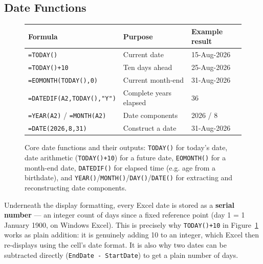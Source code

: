 \documentclass[11pt,a4paper]{article}
\begin{document}
\subsection{Date Functions}
\label{sec:datefunctions}

\begin{figure}[h]
\centering
\begin{tcolorbox}[width=0.86\linewidth,colback=white,colframe=rulegray,boxrule=0.5pt,arc=1pt]
\centering\small
\begin{tabular}{@{}L{4.8cm}L{2.8cm}L{2.6cm}@{}}
\toprule
\textbf{Formula} & \textbf{Purpose} & \textbf{Example result} \\
\midrule
\texttt{=TODAY()} & Current date & 15-Aug-2026 \\
\texttt{=TODAY()+10} & Ten days ahead & 25-Aug-2026 \\
\texttt{=EOMONTH(TODAY(),0)} & Current month-end & 31-Aug-2026 \\
\texttt{=DATEDIF(A2,\allowbreak TODAY(),\allowbreak"Y")} & Complete years elapsed & 36 \\
\texttt{=YEAR(A2)} / \texttt{=MONTH(A2)} & Date components & 2026 / 8 \\
\texttt{=DATE(2026,8,31)} & Construct a date & 31-Aug-2026 \\
\bottomrule
\end{tabular}
\end{tcolorbox}
\caption{Core date functions and their outputs: \texttt{TODAY()} for today's date, date arithmetic (\texttt{TODAY()+10}) for a future date, \texttt{EOMONTH()} for a month-end date, \texttt{DATEDIF()} for elapsed time (e.g. age from a birthdate), and \texttt{YEAR()}/\texttt{MONTH()}/\texttt{DAY()}/\texttt{DATE()} for extracting and reconstructing date components.}
\label{fig:datefns}
\end{figure}

\begin{keyconcept}
Underneath the display formatting, every Excel date is stored as a \textbf{serial number} --- an integer count of days since a fixed reference point (day 1 = 1 January 1900, on Windows Excel). This is precisely why \texttt{TODAY()+10} in Figure~\ref{fig:datefns} works as plain addition: it is genuinely adding 10 to an integer, which Excel then re-displays using the cell's date format. It is also why two dates can be subtracted directly (\texttt{EndDate - StartDate}) to get a plain number of days.
\end{keyconcept}
\end{document}
